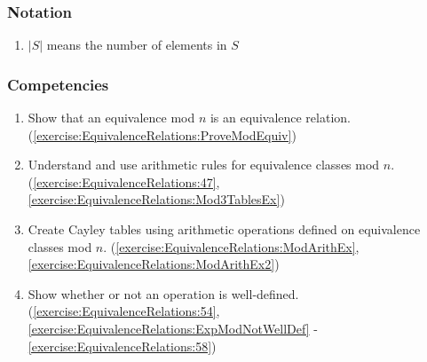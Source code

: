\subsubsection*{Notation}
\begin{enumerate}
\item 
$|S|$ means the number of elements in $S$
\end{enumerate}

\subsubsection*{Competencies}
\begin{enumerate}
\item
Show that an equivalence mod $n$ is an equivalence relation. (\ref{exercise:EquivalenceRelations:ProveModEquiv})
\item
Understand and use arithmetic rules for equivalence classes mod $n$. (\ref{exercise:EquivalenceRelations:47}, \ref{exercise:EquivalenceRelations:Mod3TablesEx})
\item
Create Cayley tables using arithmetic operations defined on equivalence classes mod $n$. (\ref{exercise:EquivalenceRelations:ModArithEx}, \ref{exercise:EquivalenceRelations:ModArithEx2})
\item
Show whether or not an operation is well-defined. (\ref{exercise:EquivalenceRelations:54}, \ref{exercise:EquivalenceRelations:ExpModNotWellDef} -  \ref{exercise:EquivalenceRelations:58})
\end{enumerate}




